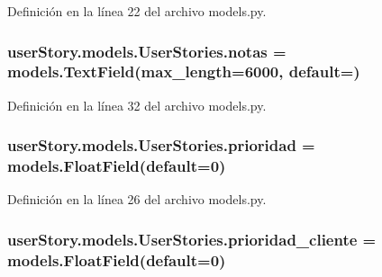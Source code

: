 Definición en la línea 22 del archivo models.\+py.

\subsubsection[{\texorpdfstring{notas}{notas}}]{\setlength{\rightskip}{0pt plus 5cm}user\+Story.\+models.\+User\+Stories.\+notas = models.\+Text\+Field(max\+\_\+length=6000, default=\textquotesingle{}\textquotesingle{})\hspace{0.3cm}{\ttfamily [static]}}\hypertarget{classuser_story_1_1models_1_1_user_stories_ae88fff4e2e6fe453a5f13412bdf1a985}{}\label{classuser_story_1_1models_1_1_user_stories_ae88fff4e2e6fe453a5f13412bdf1a985}


Definición en la línea 32 del archivo models.\+py.

\subsubsection[{\texorpdfstring{prioridad}{prioridad}}]{\setlength{\rightskip}{0pt plus 5cm}user\+Story.\+models.\+User\+Stories.\+prioridad = models.\+Float\+Field(default=0)\hspace{0.3cm}{\ttfamily [static]}}\hypertarget{classuser_story_1_1models_1_1_user_stories_a5c49ad7f64583a89297b4bc3efef1acd}{}\label{classuser_story_1_1models_1_1_user_stories_a5c49ad7f64583a89297b4bc3efef1acd}


Definición en la línea 26 del archivo models.\+py.

\subsubsection[{\texorpdfstring{prioridad\+\_\+cliente}{prioridad_cliente}}]{\setlength{\rightskip}{0pt plus 5cm}user\+Story.\+models.\+User\+Stories.\+prioridad\+\_\+cliente = models.\+Float\+Field(default=0)\hspace{0.3cm}{\ttfamily [static]}}\hypertarget{classuser_story_1_1models_1_1_user_stories_aa362ec1a6aca862e2e8093758f055c16}{}\label{classuser_story_1_1models_1_1_user_stories_aa362ec1a6aca862e2e8093758f055c16}


